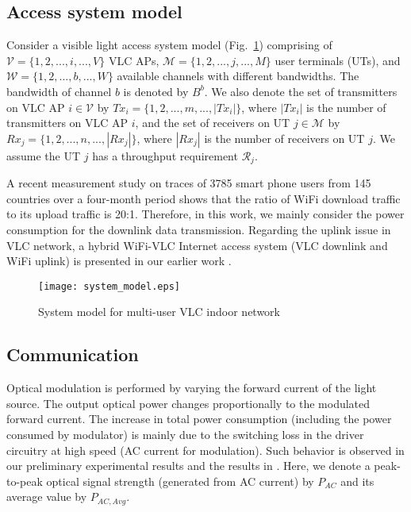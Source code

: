 \documentclass[10pt,journal]{IEEEtran}
\begin{document}
\subsection{Access system model}
Consider a visible light access system model (Fig.~\ref{fig_system_model}) comprising of $\mathcal{V}=\{1,2,...,i,...,V\}$ VLC APs, $\mathcal{M}=\{1,2,...,j,...,M\}$ user terminals (UTs), and $\mathcal{W}=\{1,2,...,b,...,W\}$ available channels with different bandwidths. The bandwidth of channel $b$ is denoted by $B^{b}$. We also denote the set of transmitters on VLC AP $i\in\mathcal{V}$ by $Tx_{i}=\{1,2,...,m,...,|Tx_{i}|\}$, where $|Tx_{i}|$ is the number of transmitters on VLC AP $i$, and the set of receivers on UT $j\in\mathcal{M}$ by $Rx_{j}=\{1,2,...,n,...,|Rx_{j}|\}$, where $|Rx_{j}|$ is the number of receivers on UT $j$. We assume the UT $j$ has a throughput requirement $\mathcal{R}_{j}$.

A recent measurement study \cite{ding2013characterizing} on traces of 3785 smart phone users from 145 countries over a four-month period shows that the ratio of WiFi download traffic to its upload traffic is 20:1. Therefore, in this work, we mainly consider the power consumption for the downlink data transmission. Regarding the uplink issue in VLC network, a hybrid WiFi-VLC Internet access system (VLC downlink and WiFi uplink) is presented in our earlier work \cite{shao2014indoor,shao2015analysis,shao2015design}.

\begin{figure}
\centering
\texttt{[image: system\_model.eps]}
\caption{System model for multi-user VLC indoor network}
\vspace{-12pt}
\label{fig_system_model}
\end{figure}



\subsection{Communication}
Optical modulation is performed by varying the forward current of the light source. The output optical power changes proportionally to the modulated forward current. The increase in total power consumption (including the power consumed by modulator) is mainly due to the switching loss in the driver circuitry at high speed (AC current for modulation). Such behavior is observed in our preliminary experimental results and the results in \cite{hsu2005optimization}. Here, we denote a peak-to-peak optical signal strength (generated from AC current) by $P_{AC}$ and its average value by $P_{AC,Avg}$.
\end{document}
